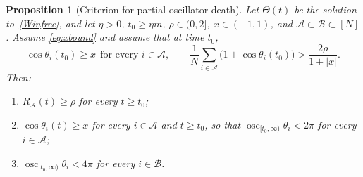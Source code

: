 \documentclass[11pt,reqno]{amsart}
\newcounter{name}
\newtheorem{proposition}[lemma]{Proposition}
\theoremstyle{definition}
\theoremstyle{remark}
\begin{document}
\begin{proposition}[Criterion for partial oscillator death]\label{prop:pod}
Let $\Theta(t)$ be the solution to~\eqref{Winfree}, and let
$\eta>0$, $t_0\ge\eta m$, $\rho\in(0,2]$, $x\in (-1,1)$, and
$\mathcal A\subset\mathcal{B}\subset [N]$. Assume \eqref{eq:xbound} and assume that at time $t_0$,
\begin{equation}\label{eq:pod-init}
\cos\theta_i(t_0)\ge x\ \ \text{for every }i\in\mathcal A,\qquad
\frac1N\sum_{i\in\mathcal A}\bigl(1+\cos\theta_i(t_0)\bigr)>\frac{2\rho}{1+|x|}.
\end{equation}
Then:
\begin{enumerate}
\item $R_\mathcal{A}(t)\ge\rho$ for every $t\ge t_0$;
\item $\cos\theta_i(t)\ge x$ for every $i\in\mathcal A$ and $t\ge t_0$, so that $\operatorname{osc}_{ [t_0,\infty)}\theta_i<2\pi$ for every
$i\in\mathcal A$;
\item $\operatorname{osc}_{[t_0,\infty)}\theta_i<4\pi$ for every
$i\in \mathcal{B}$.
\end{enumerate}
\end{proposition}
\end{document}
